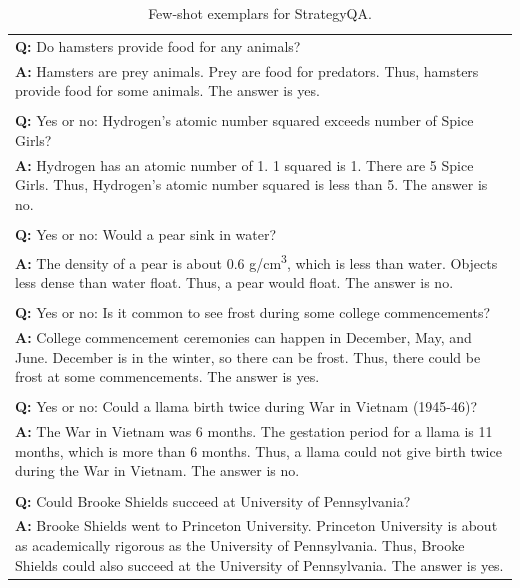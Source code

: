 \begin{table}[H]
    \caption{Few-shot exemplars for StrategyQA.}
    \label{tab:reasoningprompt}
    \centering
    \begin{tabularx}{\columnwidth}{@{}X@{}}
        \toprule
        \textbf{Q:} Do hamsters provide food for any animals? \\
        \textbf{A:} Hamsters are prey animals. Prey are food for predators. Thus, hamsters provide food for some animals. The answer is yes. \\ \\
        
        \textbf{Q:} Yes or no: Hydrogen's atomic number squared exceeds number of Spice Girls? \\
        \textbf{A:} Hydrogen has an atomic number of 1. 1 squared is 1. There are 5 Spice Girls. Thus, Hydrogen's atomic number squared is less than 5. The answer is no. \\ \\
        
        \textbf{Q:} Yes or no: Would a pear sink in water? \\
        \textbf{A:} The density of a pear is about 0.6 g/cm\textsuperscript{3}, which is less than water. Objects less dense than water float. Thus, a pear would float. The answer is no. \\ \\
        
        \textbf{Q:} Yes or no: Is it common to see frost during some college commencements? \\
        \textbf{A:} College commencement ceremonies can happen in December, May, and June. December is in the winter, so there can be frost. Thus, there could be frost at some commencements. The answer is yes. \\ \\
        
        \textbf{Q:} Yes or no: Could a llama birth twice during War in Vietnam (1945-46)? \\
        \textbf{A:} The War in Vietnam was 6 months. The gestation period for a llama is 11 months, which is more than 6 months. Thus, a llama could not give birth twice during the War in Vietnam. The answer is no. \\ \\
        
        \textbf{Q:} Could Brooke Shields succeed at University of Pennsylvania? \\
        \textbf{A:} Brooke Shields went to Princeton University. Princeton University is about as academically rigorous as the University of Pennsylvania. Thus, Brooke Shields could also succeed at the University of Pennsylvania. The answer is yes. \\
        \bottomrule
    \end{tabularx}
\end{table}


